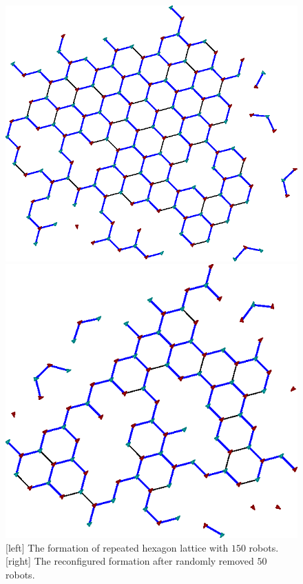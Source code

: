 \begin{figure}
    \begin{minipage}[b]{0.5\linewidth}
        \includegraphics[width=.95\columnwidth]{figs/formation-150}
    \end{minipage}
    \begin{minipage}[b]{0.45\linewidth}
        \includegraphics[width=.95\columnwidth]{figs/formation-100}
    \end{minipage}
    \caption{[left] The formation of repeated hexagon lattice with $150$ robots. [right] The reconfigured formation after randomly removed $50$ robots.}
\label{fig:robust}
\end{figure}

